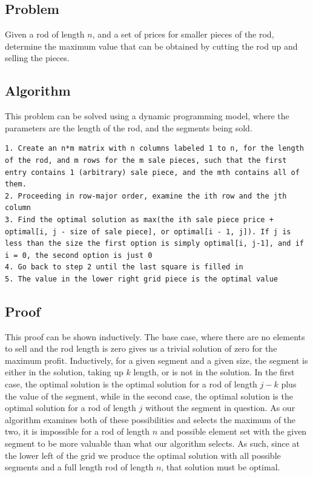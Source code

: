 \documentclass[titlepage]{article}
\numberwithin{equation}{subsection}
\begin{document}
\subsection{Problem}
Given a rod of length $n$, and a set of prices for smaller pieces of the rod, determine the maximum value that can be obtained
by cutting the rod up and selling the pieces.
\subsection{Algorithm}
This problem can be solved using a dynamic programming model, where the parameters are the length of the rod, and the segments being sold.
\begin{lstlisting}
1. Create an n*m matrix with n columns labeled 1 to n, for the length of the rod, and m rows for the m sale pieces, such that the first entry contains 1 (arbitrary) sale piece, and the mth contains all of them.
2. Proceeding in row-major order, examine the ith row and the jth column 
3. Find the optimal solution as max(the ith sale piece price + optimal[i, j - size of sale piece], or optimal[i - 1, j]). If j is less than the size the first option is simply optimal[i, j-1], and if i = 0, the second option is just 0
4. Go back to step 2 until the last square is filled in
5. The value in the lower right grid piece is the optimal value
\end{lstlisting}
\subsection{Proof}
This proof can be shown inductively. The base case, where there are no elements to sell and the rod length is zero gives us a trivial solution of
zero for the maximum profit. Inductively, for a given segment and a given size, the segment is either in the solution, taking up $k$ length, or is
not in the solution. In the first case, the optimal solution is the optimal solution for a rod of length $j-k$ plus the value of the segment,
while in the second case, the optimal solution is the optimal solution for a rod of length $j$ without the segment in question. As our algorithm examines both of these
possibilities and selects the maximum of the two, it is impossible for a rod of length $n$ and possible element set with the given segment
to be more valuable than what our algorithm selects. As such, since at the lower left of the grid we produce the optimal solution with
all possible segments and a full length rod of length $n$, that solution must be optimal.
\end{document}
